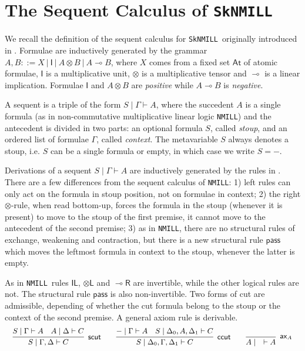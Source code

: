 \documentclass[runningheads]{llncs}
\newcommand{\tl}{\otimes \mathsf{L}}
\newcommand{\lright}{{\multimap}\mathsf{R}}
\newcommand{\pass}{\mathsf{pass}}
\newcommand{\unitl}{\mathsf{IL}}
\newcommand{\otL}{\tl}
\newcommand{\lolliR}{\lright}
\newcommand{\IL}{\unitl}
\newcommand{\ax}{\mathsf{ax}}
\newcommand{\ot}{\otimes}
\newcommand{\lolli}{\multimap}
\newcommand{\I}{\mathsf{I}}
\newcommand{\NMILL}{\texttt{NMILL}}
\newcommand{\SkNMILL}{\texttt{SkNMILL}}
\newcommand{\At}{\mathsf{At}}
\begin{document}
\section{The Sequent Calculus of \SkNMILL}\label{sec:seqcalc}

We recall the definition of the sequent calculus for \SkNMILL\ originally introduced in \cite{UVW:protsn}.
Formulae are inductively generated by the grammar $A,B ::= X \ | \ \I \ | \ A \ot B \ | \ A \lolli B$, where $X$ comes from a fixed set $\At$ of atomic formulae, $\I$ is a multiplicative unit, $\ot$ is a multiplicative tensor and $\lolli$ is a linear implication. Formulae $\I$ and $A \ot B$ are \emph{positive} while $A \lolli B$ is \emph{negative}. 

A sequent is a triple of the form $S \mid \Gamma \vdash A$, where the succedent $A$ is a single formula (as in non-commutative multiplicative linear logic \NMILL) and the antecedent is divided in two parts: an optional formula $S$, called \emph{stoup}, and an ordered list of formulae $\Gamma$, called \emph{context}. 
The metavariable $S$ always denotes a stoup, i.e. $S$ can be a single formula or empty, in which case we write $S = -$.

Derivations of a sequent $S \mid \Gamma \vdash A$ are inductively generated by the rules in .
There are a few differences from the sequent calculus of \NMILL:
1) left rules can only act on the formula in stoup position, not on formulae in context; 2) the right $\ot$-rule, when read bottom-up, forces the formula in the stoup (whenever it is present) to move to the stoup of the first premise, it cannot move to the antecedent of the second premise; 3) as in \NMILL, there are no structural rules of exchange, weakening and contraction, but there is a new structural rule $\pass$ which moves the leftmost formula in context to the stoup, whenever the latter is empty.

As in \NMILL\, rules $\IL$, $\otL$ and $\lolliR$ are invertible, while the other logical rules are not. The structural rule $\pass$ is also non-invertible.
Two forms of cut are admissible, depending of whether the cut formula belong to the stoup or the context of the second premise. A general axiom rule is derivable.
\[
\small
    \infer[\mathsf{scut}]{S \mid \Gamma , \Delta \vdash C}{
      S \mid \Gamma \vdash A
      &
      A \mid \Delta \vdash C
    }
    \qquad
    \infer[\mathsf{ccut}]{S \mid \Delta_0 , \Gamma , \Delta_1 \vdash C}{
      - \mid \Gamma \vdash A
      &
      S \mid \Delta_0 , A , \Delta_1 \vdash C
    }
    \qquad
    \infer[\ax_A]{A \mid \quad \vdash A}{}
\]
\end{document}
